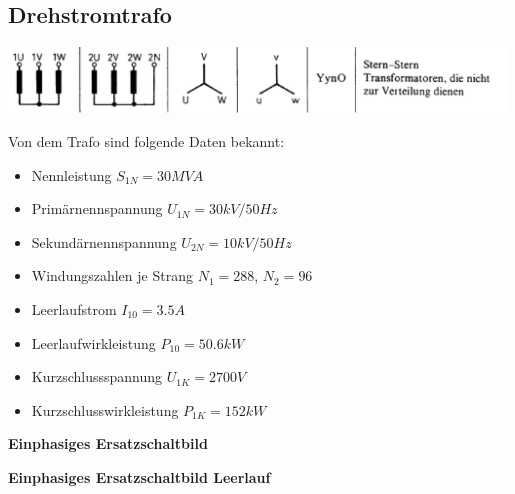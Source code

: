 \newpage
\subsection{Drehstromtrafo}
\includegraphics[width=0.99\textwidth]{bilder/a71.png}

\begin{minipage}{0.49\textwidth}
Von dem Trafo sind folgende Daten bekannt:
\begin{itemize}
\itemsep0em
\item Nennleistung $S_{1N} = 30MVA$
\item Primärnennspannung $ U_{1N} = 30kV / 50Hz$
\item Sekundärnennspannung $ U_{2N} = 10kV / 50Hz$ 
\item Windungszahlen je Strang $N_1 = 288$, $N_2 = 96$
\item Leerlaufstrom $I_{10} = 3.5A$
\item Leerlaufwirkleistung $P_{10} = 50.6kW$
\item Kurzschlussspannung $U_{1K} = 2700V$
\item Kurzschlusswirkleistung $P_{1K} = 152kW$
\end{itemize}
\end{minipage}
\begin{minipage}{0.49\textwidth}
\textbf{Einphasiges Ersatzschaltbild}


\textbf{Einphasiges Ersatzschaltbild Leerlauf}

\end{minipage}


